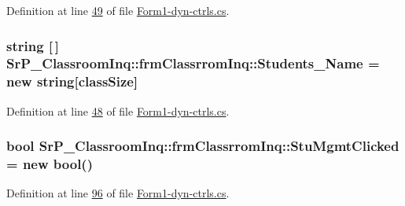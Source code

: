 \-Definition at line \hyperlink{_form1-dyn-ctrls_8cs_source_l00049}{49} of file \hyperlink{_form1-dyn-ctrls_8cs_source}{\-Form1-\/dyn-\/ctrls.\-cs}.

\hypertarget{class_sr_p___classroom_inq_1_1frm_classrrom_inq_ad595ee0cb55235eda789723fe8967521}{
\subsubsection[{\-Students\-\_\-\-Name}]{\setlength{\rightskip}{0pt plus 5cm}string \mbox{[}$\,$\mbox{]} {\bf \-Sr\-P\-\_\-\-Classroom\-Inq\-::frm\-Classrrom\-Inq\-::\-Students\-\_\-\-Name} = new string\mbox{[}{\bf class\-Size}\mbox{]}}}
\label{class_sr_p___classroom_inq_1_1frm_classrrom_inq_ad595ee0cb55235eda789723fe8967521}


\-Definition at line \hyperlink{_form1-dyn-ctrls_8cs_source_l00048}{48} of file \hyperlink{_form1-dyn-ctrls_8cs_source}{\-Form1-\/dyn-\/ctrls.\-cs}.

\hypertarget{class_sr_p___classroom_inq_1_1frm_classrrom_inq_ad0a57ebb96913cfbb9622d8c4c7b52cb}{
\subsubsection[{\-Stu\-Mgmt\-Clicked}]{\setlength{\rightskip}{0pt plus 5cm}bool {\bf \-Sr\-P\-\_\-\-Classroom\-Inq\-::frm\-Classrrom\-Inq\-::\-Stu\-Mgmt\-Clicked} = new bool()}}
\label{class_sr_p___classroom_inq_1_1frm_classrrom_inq_ad0a57ebb96913cfbb9622d8c4c7b52cb}


\-Definition at line \hyperlink{_form1-dyn-ctrls_8cs_source_l00096}{96} of file \hyperlink{_form1-dyn-ctrls_8cs_source}{\-Form1-\/dyn-\/ctrls.\-cs}.

